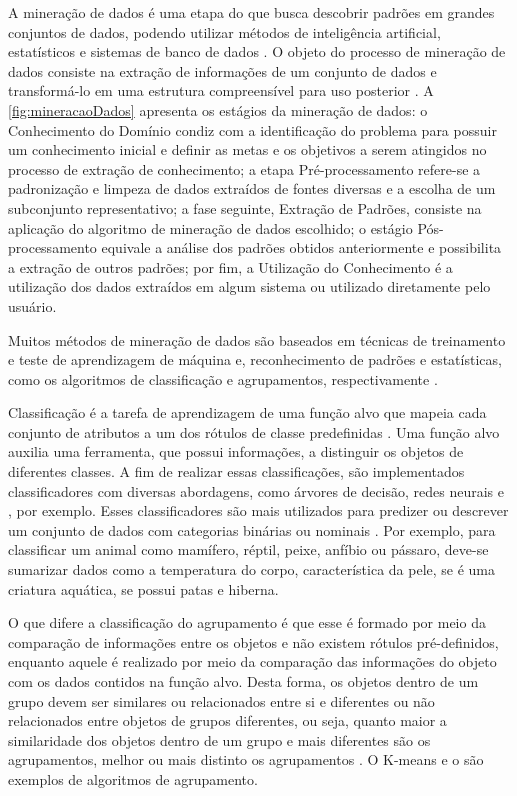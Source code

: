 		A mineração de dados é uma etapa do 
		\cite{fayyad1996} que busca descobrir padrões em grandes conjuntos de dados,
		podendo utilizar métodos de inteligência artificial, estatísticos e sistemas
		de banco de dados \cite{chakrabarti2006}. O objeto do processo de mineração
		de dados consiste na extração de informações de um conjunto de dados e
		transformá-lo em uma estrutura compreensível para uso posterior \cite{chakrabarti2006}.
		A \cref{fig:mineracaoDados} apresenta os estágios da mineração de dados:
		o Conhecimento do Domínio condiz com a identificação do problema para possuir
		um conhecimento inicial e definir as metas e os objetivos a serem atingidos
		no processo de extração de conhecimento; a etapa Pré-processamento refere-se
		a padronização e limpeza de dados extraídos de fontes diversas e  a escolha
		de um subconjunto representativo; a fase seguinte, Extração de Padrões, 
		consiste na aplicação do algoritmo de mineração de dados escolhido; o estágio
		Pós-processamento equivale a análise dos padrões obtidos anteriormente e
		possibilita a extração de outros padrões; por fim, a Utilização do Conhecimento
		é a utilização dos dados extraídos em algum sistema ou utilizado diretamente
		pelo usuário.
		
		Muitos métodos de mineração de dados são baseados em técnicas de treinamento
		e teste de aprendizagem de máquina e, reconhecimento de padrões e estatísticas,
		como os algoritmos de classificação e agrupamentos, respectivamente \cite{fayyad1996}.
		
		Classificação é a tarefa de aprendizagem de uma função alvo que mapeia cada
		conjunto de atributos a um dos rótulos de classe predefinidas \cite{Tan:2005:ch4}.
		Uma função alvo auxilia uma ferramenta, que possui informações, a distinguir
		os objetos de diferentes classes. A fim de realizar essas classificações, são
		implementados classificadores com diversas abordagens, como árvores de decisão,
		redes neurais e , por exemplo. Esses
		classificadores são mais utilizados para predizer ou descrever um conjunto
		de dados com categorias binárias ou nominais \cite{Tan:2005:ch4}. Por exemplo,
		para classificar um animal como mamífero, réptil, peixe, anfíbio ou pássaro,
		deve-se sumarizar dados como a temperatura do corpo, característica da pele,
		se é uma criatura aquática, se possui patas e hiberna.
		
		O que difere a classificação do agrupamento é que esse é formado por meio da
		comparação de informações entre os objetos e não existem rótulos pré-definidos,
		enquanto aquele é realizado por meio da comparação das informações do objeto
		com os dados contidos na função alvo. Desta forma, os objetos dentro de um grupo
		devem ser similares ou relacionados entre si e diferentes ou não relacionados
		entre objetos de grupos diferentes, ou seja, quanto maior a similaridade dos
		objetos dentro de um grupo e mais diferentes são os agrupamentos, melhor ou
		mais distinto os agrupamentos \cite{Tan:2005:ch8}. O K-means \cite{macqueen1967}
		e o  \cite{Ester1996}
		são exemplos de algoritmos de agrupamento.

